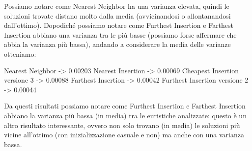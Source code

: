\documentclass[a4paper,12pt]{report}
\begin{document}
Possiamo notare come Nearest Neighbor ha una varianza elevata, quindi le soluzioni trovate distano molto dalla media (avvicinandosi o allontanandosi dall'ottimo). Dopodiché possiamo notare come Furthest Insertion e Farthest Insertion abbiano una varianza tra le più basse (possiamo forse affermare che abbia la varianza più bassa), andando a considerare la media delle varianze otteniamo:
\begin{myverbatim}
Nearest Neighbor ->              0.00203
Nearest Insertion ->             0.00069
Cheapest Insertion versione 3 -> 0.00088
Farthest Insertion ->            0.00042
Furthest Insertion versione 2 -> 0.00044
\end{myverbatim}
Da questi risultati possiamo notare come Furthest Insertion e Farthest Insertion abbiano la varianza più bassa (in media) tra le euristiche analizzate: questo è un altro risultato interessante, ovvero non solo trovano (in media) le soluzioni più vicine all'ottimo (con inizializzazione casuale e non) ma anche con una varianza bassa.
\end{document}
